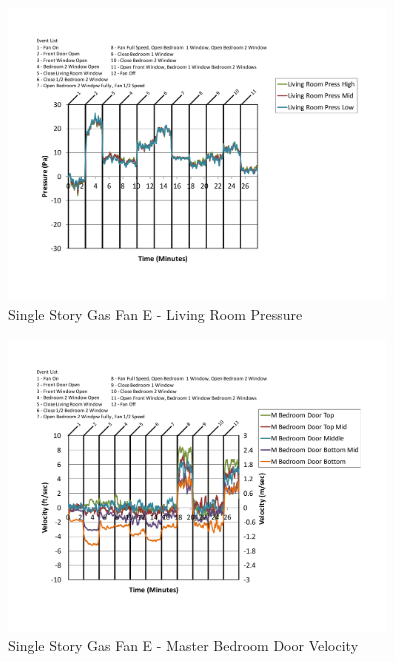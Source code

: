 \documentclass{article}
\begin{document}
\begin{appendices}
	\begin{figure}[H]
		\centering
		\includegraphics[height=3.05in,trim=0.67in 1.1in 0.67in 0.8in,clip=true]{0_Images/Results_Charts/ColdFlow/Single_Story/Gas/E/Living_Room_Pressure.pdf}
		\caption{Single Story Gas Fan E - Living Room Pressure}
	\end{figure}
 

	\begin{figure}[H]
		\centering
		\includegraphics[height=3.05in,trim=0.67in 1.1in 0.67in 0.8in,clip=true]{0_Images/Results_Charts/ColdFlow/Single_Story/Gas/E/Master_Bedroom_Door_Velocity.pdf}
		\caption{Single Story Gas Fan E - Master Bedroom Door Velocity}
	\end{figure}
 
	\clearpage


\end{appendices}
\end{document}
